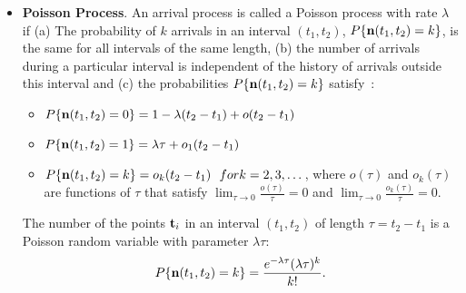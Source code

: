 \documentclass[a4paper, oneside]{book}
\begin{document}
\begin{itemize}
\begin{itemize}
	
	
	\end{itemize}
	\item \textbf{Poisson Process}. An arrival process is called a Poisson process with rate $\lambda$ if (a) The probability of $k$ arrivals in an interval $(t_1,t_2)$, $P\{\mathbf n(t_1,t_2)=k\}$, is the same for all intervals of the same length, (b) the number of arrivals during a particular interval is independent of the history of arrivals outside this interval and (c) the probabilities $P\{\mathbf n(t_1, t_2)=k\}$ satisfy~\cite{bertsekas08}:
	\begin{itemize}
	\item $P\{\mathbf n(t_1,t_2)=0\} = 1 - \lambda(t_2-t_1)+o(t_2-t_1)$
	\item $P\{\mathbf n(t_1,t_2)=1\} = \lambda\tau + o_1(t_2-t_1)$
	\item $P\{\mathbf n(t_1,t_2)=k\} = o_k(t_2-t_1)\,\,\,\, for k=2,3,\dots$, where $o(\tau)$ and $o_k(\tau)$ are functions of $\tau$ that satisfy $\lim_{\tau\to 0}\frac{o(\tau)}{\tau} = 0$ and $\lim_{\tau\to 0} \frac{o_k(\tau)}{\tau} = 0$.
	\end{itemize}
	The number of the points $\mathbf t_i$ in an interval $(t_1,t_2)$ of length $\tau = t_2-t_1$ is a Poisson random variable  with parameter $\lambda \tau$:
	\begin{equation}
	P\{\mathbf n(t_1,t_2) = k\} = \frac{e^{-\lambda \tau}(\lambda \tau)^k}{k!}.
	\end{equation}
\end{itemize}
\end{document}
